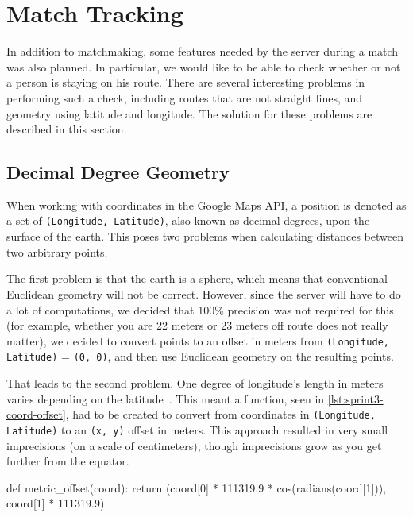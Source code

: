 \section{Match Tracking}
\label{sec:sprint3-gameserver}

In addition to matchmaking, some features needed by the server during a match was also planned. In particular, we would like to be able to check whether or not a person is staying on his route. There are several interesting problems in performing such a check, including routes that are not straight lines, and geometry using latitude and longitude. The solution for these problems are described in this section.

\subsection{Decimal Degree Geometry}
When working with coordinates in the Google Maps \ac{API}, a position is denoted as a set of \texttt{(Longitude, Latitude)}, also known as decimal degrees, upon the surface of the earth. This poses two problems when calculating distances between two arbitrary points.

The first problem is that the earth is a sphere, which means that conventional Euclidean geometry will not be correct. However, since the server will have to do a lot of computations, we decided that 100\% precision was not required for this (for example, whether you are 22 meters or 23 meters off route does not really matter), we decided to convert points to an offset in meters from \texttt{(Longitude, Latitude)} = \texttt{(0, 0)}, and then use Euclidean geometry on the resulting points.

That leads to the second problem. One degree of longitude's length in meters varies depending on the latitude~\citep{wikidecimaldegrees}. This meant a function, seen in \autoref{lst:sprint3-coord-offset}, had to be created to convert from coordinates in \texttt{(Longitude, Latitude)} to an \texttt{(x, y)} offset in meters. This approach resulted in very small imprecisions (on a scale of centimeters), though imprecisions grow as you get further from the equator.

\begin{code}[label={lst:sprint3-coord-offset}, caption={Convert Decimal Degrees to Offset in Meters}, language={Python}]
def metric_offset(coord):
	return (coord[0] * 111319.9 * cos(radians(coord[1])), coord[1] * 111319.9)
\end{code}

